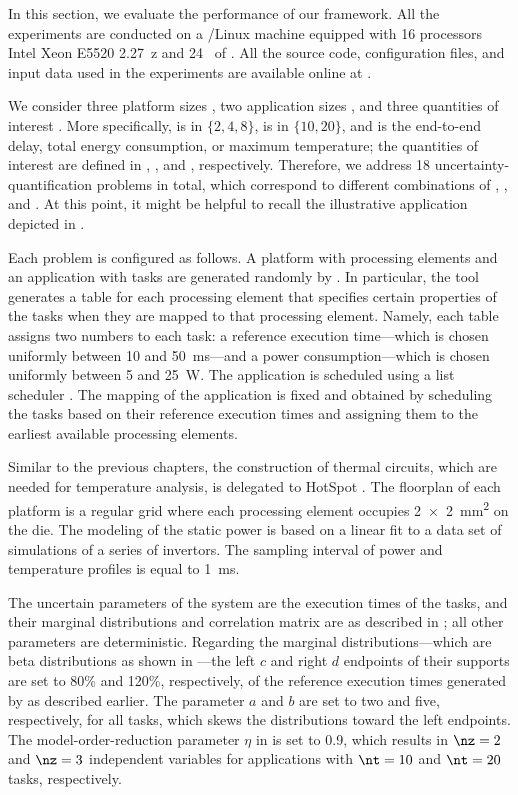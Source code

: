 In this section, we evaluate the performance of our framework. All the
experiments are conducted on a /Linux machine equipped with 16
processors Intel Xeon E5520 2.27~z and 24~ of . All the
source code, configuration files, and input data used in the experiments are
available online at \cite{eslab2017a}.

We consider three platform sizes \np, two application sizes \nt, and three
quantities of interest \g. More specifically, \np is in $\{ 2, 4, 8 \}$, \nt is
in $\{ 10, 20 \}$, and \g is the end-to-end delay, total energy consumption, or
maximum temperature; the quantities of interest are defined in
, , and
, respectively. Therefore, we address 18
uncertainty-quantification problems in total, which correspond to different
combinations of \np, \nt, and \g. At this point, it might be helpful to recall
the illustrative application depicted in .

Each problem is configured as follows. A platform with \np processing elements
and an application with \nt tasks are generated randomly by 
\cite{dick1998}. In particular, the tool generates a table for each processing
element that specifies certain properties of the tasks when they are mapped to
that processing element. Namely, each table assigns two numbers to each task: a
reference execution time---which is chosen uniformly between 10 and 50~ms---and
a power consumption---which is chosen uniformly between 5 and 25~W. The
application is scheduled using a list scheduler \cite{adam1974}. The mapping of
the application is fixed and obtained by scheduling the tasks based on their
reference execution times and assigning them to the earliest available
processing elements.

Similar to the previous chapters, the construction of thermal  circuits,
which are needed for temperature analysis, is delegated to HotSpot
\cite{skadron2003}. The floorplan of each platform is a regular grid where each
processing element occupies 2~×~2~mm\textsuperscript{2} on the die. The modeling
of the static power is based on a linear fit to a data set of 
simulations of a series of  invertors. The sampling interval of power
and temperature profiles is equal to 1~ms.

The uncertain parameters \vu of the system are the execution times of the tasks,
and their marginal distributions and correlation matrix are as described in
; all other parameters are deterministic.
Regarding the marginal distributions---which are beta distributions as shown in
---the left $c$ and right $d$ endpoints of their
supports are set to 80\% and 120\%, respectively, of the reference execution
times generated by  as described earlier. The parameter $a$ and $b$ are
set to two and five, respectively, for all tasks, which skews the distributions
toward the left endpoints. The model-order-reduction parameter $\eta$ in
 is set to 0.9, which results in $\nz = 2$ and $\nz
= 3$ independent variables for applications with $\nt = 10$ and $\nt = 20$
tasks, respectively.

